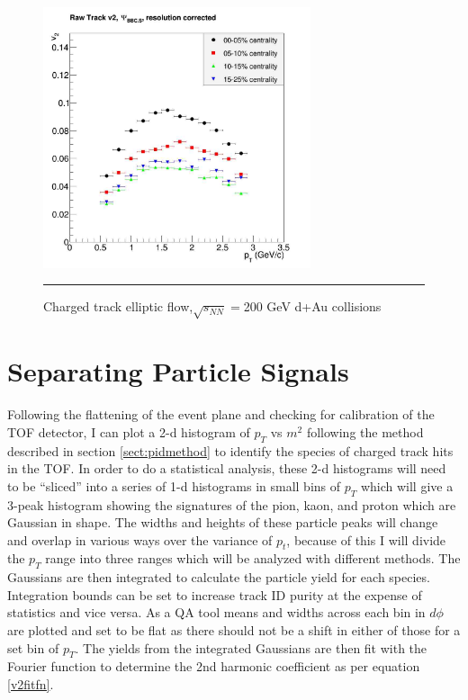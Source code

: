 \begin{figure}[htbp!]
  \centering
    \includegraphics[width=0.7\textwidth]{chargedtrackv2/rawtrackv2_bbcNS.jpg}
    \rule{35em}{0.5pt}
  \caption[Charged track elliptic flow,$\sqrt{s_{NN}}=$200 GeV d+Au collisions]{Charged track elliptic flow,$\sqrt{s_{NN}}=$200 GeV d+Au collisions}
  \label{fig:alltrackv2}
\end{figure}
\clearpage
\section{Separating Particle Signals}
Following the flattening of the event plane and checking for calibration of the TOF detector, I can plot a 2-d histogram of $p_T$ vs $m^2$ following the method described in section \ref{sect:pidmethod} to identify the species of charged track hits in the TOF. In order to do a statistical analysis, these 2-d histograms will need to be ``sliced'' into a series of 1-d histograms in small bins of $p_T$ which will give a 3-peak histogram showing the signatures of the pion, kaon, and proton which are Gaussian in shape. The widths and heights of these particle peaks will change and overlap in various ways over the variance of $p_t$, because of this I will divide the $p_T$ range into three ranges which will be analyzed with different methods. The Gaussians are then integrated to calculate the particle yield for each species. Integration bounds can be set to increase track ID purity at the expense of statistics and vice versa. As a QA tool means and widths across each bin in $d\phi$ are plotted and set to be flat as there should not be a shift in either of those for a set bin of $p_T$. The yields from the integrated Gaussians are then fit with the Fourier function to determine the 2nd harmonic coefficient as per equation \ref{v2fitfn}.

